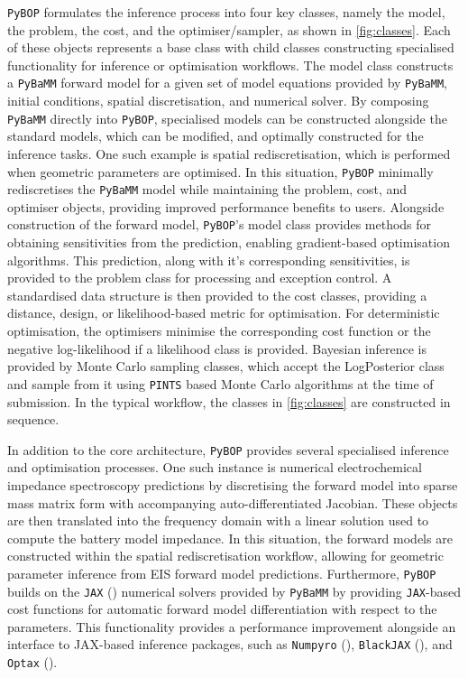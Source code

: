 \documentclass[
]{article}
\begin{document}
\texttt{PyBOP} formulates the inference process into four key classes,
namely the model, the problem, the cost, and the optimiser/sampler, as
shown in \autoref{fig:classes}. Each of these objects represents a base
class with child classes constructing specialised functionality for
inference or optimisation workflows. The model class constructs a
\texttt{PyBaMM} forward model for a given set of model equations
provided by \texttt{PyBaMM}, initial conditions, spatial discretisation,
and numerical solver. By composing \texttt{PyBaMM} directly into
\texttt{PyBOP}, specialised models can be constructed alongside the
standard models, which can be modified, and optimally constructed for
the inference tasks. One such example is spatial rediscretisation, which
is performed when geometric parameters are optimised. In this situation,
\texttt{PyBOP} minimally rediscretises the \texttt{PyBaMM} model while
maintaining the problem, cost, and optimiser objects, providing improved
performance benefits to users. Alongside construction of the forward
model, \texttt{PyBOP}'s model class provides methods for obtaining
sensitivities from the prediction, enabling gradient-based optimisation
algorithms. This prediction, along with it's corresponding
sensitivities, is provided to the problem class for processing and
exception control. A standardised data structure is then provided to the
cost classes, providing a distance, design, or likelihood-based metric
for optimisation. For deterministic optimisation, the optimisers
minimise the corresponding cost function or the negative log-likelihood
if a likelihood class is provided. Bayesian inference is provided by
Monte Carlo sampling classes, which accept the LogPosterior class and
sample from it using \texttt{PINTS} based Monte Carlo algorithms at the
time of submission. In the typical workflow, the classes in
\autoref{fig:classes} are constructed in sequence.

In addition to the core architecture, \texttt{PyBOP} provides several
specialised inference and optimisation processes. One such instance is
numerical electrochemical impedance spectroscopy predictions by
discretising the forward model into sparse mass matrix form with
accompanying auto-differentiated Jacobian. These objects are then
translated into the frequency domain with a linear solution used to
compute the battery model impedance. In this situation, the forward
models are constructed within the spatial rediscretisation workflow,
allowing for geometric parameter inference from EIS forward model
predictions. Furthermore, \texttt{PyBOP} builds on the \texttt{JAX}
() numerical solvers
provided by \texttt{PyBaMM} by providing \texttt{JAX}-based cost
functions for automatic forward model differentiation with respect to
the parameters. This functionality provides a performance improvement
alongside an interface to JAX-based inference packages, such as
\texttt{Numpyro} (),
\texttt{BlackJAX} (),
and \texttt{Optax} ().
\end{document}

